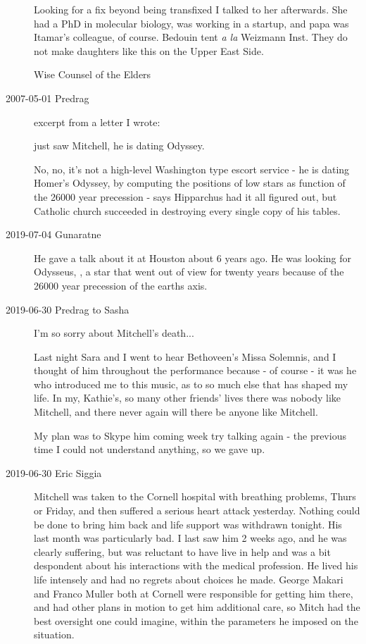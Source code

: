 \begin{description}
Looking for a fix beyond being transfixed I talked to her afterwards. She
had a PhD in molecular biology, was working in a startup, and papa was
Itamar's colleague, of course. Bedouin tent \emph{a la} Weizmann Inst.
They do not make daughters like this on the Upper East Side.

Wise Counsel of the Elders



\item[2007-05-01 Predrag] excerpt from a letter I wrote:

just saw Mitchell, he is dating Odyssey.

No, no, it's not a high-level Washington type escort service - he is
dating Homer's Odyssey, by computing the positions of low stars as
function of the 26000 year precession - says
 {Hipparchus}  had it all
figured out, but Catholic church succeeded in destroying every single
copy of his tables.

\item[2019-07-04 Gunaratne]

He gave a talk about it at Houston about 6 years ago. He was looking for
Odysseus, \ie, a star that went out of view for twenty years because of
the 26000 year precession of the earths axis.

\item[2019-06-30 Predrag to Sasha]

I'm so sorry about Mitchell's death...

Last night Sara and I went to hear Bethoveen's Missa Solemnis, and I
thought of him throughout the performance because - of course - it was he
who introduced me to this music, as to so much else that has shaped my
life. In my, Kathie's, so many other friends' lives there was nobody like
Mitchell, and there never again will there be anyone like Mitchell.

My plan was to Skype him coming week try talking again - the previous
time I could not understand anything, so we gave up.

\item[2019-06-30 Eric Siggia]
Mitchell was taken to the Cornell hospital with breathing problems, Thurs
or Friday, and then suffered a serious heart attack yesterday. Nothing
could be done to bring him back and life support was withdrawn tonight.
His last month was particularly bad. I last saw him 2 weeks ago, and he
was clearly suffering, but was reluctant to have live in help and was a
bit despondent about his interactions with the medical profession. He
lived his life intensely and had no regrets about choices he made. George
Makari and Franco Muller both at Cornell were responsible for getting him
there, and had other plans in motion to get him additional care, so Mitch
had the best oversight one could imagine, within the parameters he
imposed on the situation.


\end{description}
